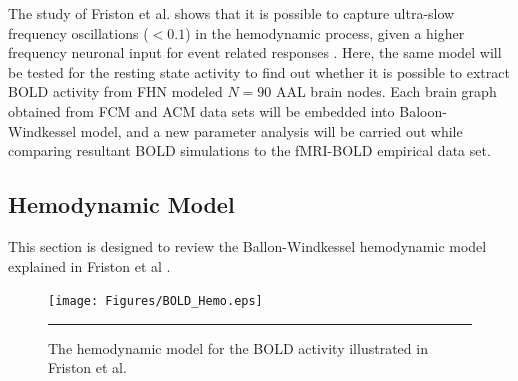 The study of Friston et al. shows that it is possible to capture ultra-slow frequency oscillations ($<0.1$) in the hemodynamic process, given a higher frequency neuronal input for event related responses \citep{FRI00}. Here, the same model will be tested for the resting state activity to find out whether it is possible to extract BOLD activity from FHN modeled $N=90$ AAL brain nodes. Each brain graph obtained from FCM and ACM data sets will be embedded into Baloon-Windkessel model, and a new parameter analysis will be carried out while comparing resultant BOLD simulations to the fMRI-BOLD empirical data set.

  

\subsection{Hemodynamic Model}

This section is designed to review the Ballon-Windkessel hemodynamic model explained in Friston et al \citep{FRI00}.  


\begin{figure}[htbp]
  \centering
	\texttt{[image: Figures/BOLD\_Hemo.eps]}
 	\rule{35em}{0.5pt}
    \caption[Hemodynamic Model]{The hemodynamic model for the BOLD activity illustrated in Friston et al. \citep{FRI00}  }
  \label{fig:Hemodynamic Model}	
\end{figure}


